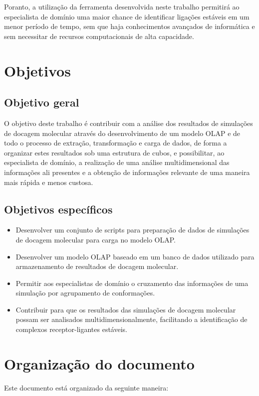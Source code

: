 Poranto, a utilização da ferramenta desenvolvida neste trabalho permitirá ao especialista de domínio uma maior chance de identificar ligações estáveis em um menor período de tempo, sem que haja conhecimentos avançados de informática e sem necessitar de recursos computacionais de alta capacidade.

\section{Objetivos}
\subsection{Objetivo geral}
O objetivo deste trabalho é contribuir com a análise dos resultados de simulações de docagem molecular através do desenvolvimento de um modelo OLAP e de todo o processo de extração, transformação e carga de dados, de forma a organizar estes resultados sob uma estrutura de cubos, e possibilitar, ao especialista de domínio, a realização de uma análise multidimensional das informações ali presentes e a obtenção de informações relevante de uma maneira mais rápida e menos custosa.

\subsection{Objetivos específicos}
\begin{itemize}
	\item Desenvolver um conjunto de scripts para preparação de dados de simulações de docagem molecular para carga no modelo OLAP.
	\item Desenvolver um modelo OLAP baseado em um banco de dados utilizado para armazenamento de resultados de docagem molecular.
	\item Permitir aos especialistas de domínio o cruzamento das informações de uma simulação por agrupamento de conformações.
	\item Contribuir para que os resultados das simulações de docagem molecular possam ser analisados multidimensionalmente, facilitando a identificação de complexos receptor-ligantes estáveis.
\end{itemize}

\section{Organização do documento}

Este documento está organizado da seguinte maneira:

